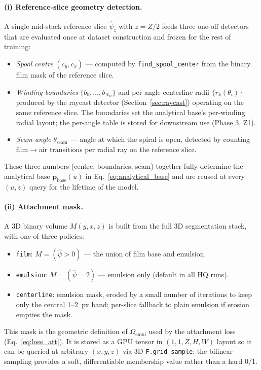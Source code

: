 \documentclass[11pt,a4paper]{article}
\begin{document}
\paragraph{(i) Reference-slice geometry detection.} A single mid-stack reference slice $\hat\psi_z$ with $z = Z/2$ feeds three one-off detectors that are evaluated once at dataset construction and frozen for the rest of training:
\begin{itemize}
    \item \emph{Spool centre} $(c_y, c_x)$ — computed by \texttt{find\_spool\_center} from the binary film mask of the reference slice.
    \item \emph{Winding boundaries} $\{b_0, \ldots, b_{N_w}\}$ and per-angle centerline radii $\{r_k(\theta_i)\}$ — produced by the raycast detector (Section~\ref{sec:raycast}) operating on the same reference slice. The boundaries set the analytical base's per-winding radial layout; the per-angle table is stored for downstream use (Phase 3, Z1).
    \item \emph{Seam angle} $\theta_{\text{seam}}$ — angle at which the spiral is open, detected by counting film$\to$air transitions per radial ray on the reference slice.
\end{itemize}
These three numbers (centre, boundaries, seam) together fully determine the analytical base $\bm{p}_{\text{base}}(u)$ in Eq.~\eqref{eq:analytical_base} and are reused at every $(u, z)$ query for the lifetime of the model.

\paragraph{(ii) Attachment mask.} A 3D binary volume $M(y, x, z)$ is built from the full 3D segmentation stack, with one of three policies:
\begin{itemize}
    \item \texttt{film}: $M = (\hat\psi > 0)$ — the union of film base and emulsion.
    \item \texttt{emulsion}: $M = (\hat\psi = 2)$ — emulsion only (default in all HQ runs).
    \item \texttt{centerline}: emulsion mask, eroded by a small number of iterations to keep only the central 1--2~px band; per-slice fallback to plain emulsion if erosion empties the mask.
\end{itemize}
This mask is the geometric definition of $\Omega_{\text{emul}}$ used by the attachment loss (Eq.~\eqref{eq:loss_att}). It is stored as a GPU tensor in $(1, 1, Z, H, W)$ layout so it can be queried at arbitrary $(x, y, z)$ via 3D \texttt{F.grid\_sample}; the bilinear sampling provides a soft, differentiable membership value rather than a hard 0/1.
\end{document}
